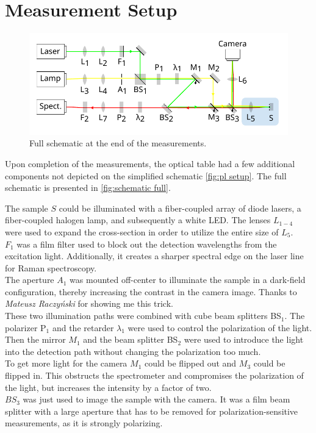 \documentclass[
	oneside,
	parskip=half,
	a4paper,
]{scrbook}
\begin{document}
\section{Measurement Setup}
\begin{figure}
	\centering
	\includegraphics{../figures/setup.pdf}
	\caption{Full schematic at the end of the measurements.}
	\label{fig:schematic full}
\end{figure}
Upon completion of the measurements, the optical table had a few additional components not depicted on the simplified schematic \autoref{fig:pl setup}.
The full schematic is presented in \autoref{fig:schematic full}.

The sample $S$ could be illuminated with a fiber-coupled array of diode lasers, a fiber-coupled halogen lamp, and subsequently a white LED.
The lenses $L_{1-4}$ were used to expand the cross-section in order to utilize the entire size of $L_5$. \\
$F_1$ was a film filter used to block out the detection wavelengths from the excitation light.
Additionally, it creates a sharper spectral edge on the laser line for Raman spectroscopy.\\
The aperture $A_1$ was mounted off-center to illuminate the sample in a dark-field configuration, thereby increasing the contrast in the camera image.
Thanks to \textit{Mateusz Raczyński} for showing me this trick.\\
These two illumination paths were combined with cube beam splitters BS$_1$.
The polarizer P$_1$ and the retarder $\lambda_1$ were used to control the polarization of the light.\\
Then the mirror $M_1$ and the beam splitter BS$_2$ were used to introduce the light into the detection path without changing the polarization too much.\\
To get more light for the camera $M_1$ could be flipped out and $M_3$ could be flipped in.
This obstructs the spectrometer and compromises the polarization of the light, but increases the intensity by a factor of two.\\
$BS_3$ was just used to image the sample with the camera. 
It was a film beam splitter with a large aperture that has to be removed for polarization-sensitive measurements, as it is strongly polarizing.
\end{document}
